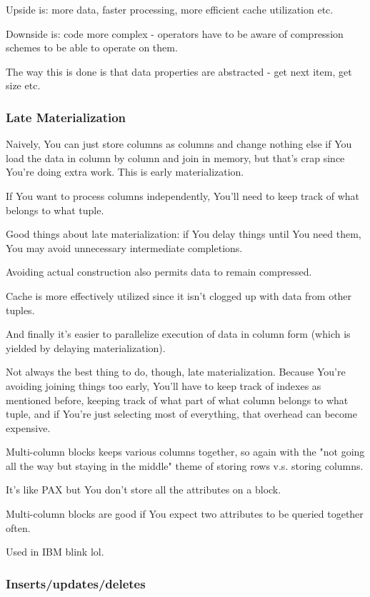 \documentclass{article}
\begin{document}
			Upside is: more data, faster processing, more efficient cache utilization etc.
			
			Downside is: code more complex - operators have to be aware of compression schemes to be able to operate on them.
			
			The way this is done is that data properties are abstracted - get next item, get size etc.
			
		\subsubsection{Late Materialization}
		
			Naively, You can just store columns as columns and change nothing else if You load the data in column by column and join in memory, but that's crap since You're doing extra work. This is early materialization.
			
			If You want to process columns independently, You'll need to keep track of what belongs to what tuple.
			
			Good things about late materialization: if You delay things until You need them, You may avoid unnecessary intermediate completions. 
			
			Avoiding actual construction also permits data to remain compressed.
			
			Cache is more effectively utilized since it isn't clogged up with data from other tuples.
			
			And finally it's easier to parallelize execution of data in column form (which is yielded by delaying materialization).
			
			Not always the best thing to do, though, late materialization. Because You're avoiding joining things too early, You'll have to keep track of indexes as mentioned before, keeping track of what part of what column belongs to what tuple, and if You're just selecting most of everything, that overhead can become expensive.
			
			Multi-column blocks keeps various columns together, so again with the "not going all the way but staying in the middle" theme of storing rows v.s. storing columns.
			
			It's like PAX but You don't store all the attributes on a block.
			
			Multi-column blocks are good if You expect two attributes to be queried together often.
			
			Used in IBM blink lol.
			
		\subsubsection{Inserts/updates/deletes}
		
\end{document}
